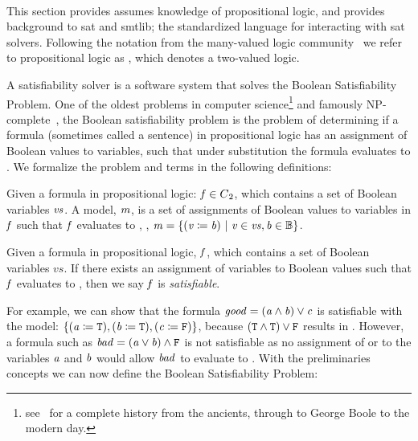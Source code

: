~\label{section:sat-solving}

This section provides assumes knowledge of propositional logic, and provides
background to \acl{sat} and \ac{smtlib}; the standardized language for
interacting with \ac{sat} solvers. Following the notation from the many-valued
logic community~\cite{Rescher1969-RESML} we refer to propositional logic as
\pl{}, which denotes a two-valued logic.

A satisfiability solver is a software system that solves the Boolean
Satisfiability Problem. One of the oldest problems in computer
science\footnote{see~\citet{BBH+09} for a complete history from the ancients,
  through to George Boole to the modern day.} and famously
NP-complete~\cite{10.1145/800157.805047}, the Boolean satisfiability problem is
the problem of determining if a formula (sometimes called a sentence) in
propositional logic has an assignment of Boolean values to variables, such that
under substitution the formula evaluates to \tru{}. We formalize the problem and
terms in the following definitions:

\begin{definition}[Model]
  Given a formula in propositional logic: $\mathit{f} \in {C\textsubscript{2}}{}$, which contains a
  set of Boolean variables $\mathit{vs}$. A model, $\mathit{m}$, is a set of assignments
  of Boolean values to variables in $\mathit{f}$ such that $\mathit{f}$ evaluates to
  \tru{}, \ie{}, $\mathit{m = \{ (v \coloneqq{} b)\ |\ v \in vs, b \in \mathbb{B}} \}$.
\end{definition}

\begin{definition}[Satisfiable]
  Given a formula in propositional logic, $\mathit{f}$, which
  contains a set of Boolean variables $vs$. If there exists an assignment of
  variables to Boolean values such that $\mathit{f}$ evaluates to \tru{}, then we
  say $\mathit{f}$ is \emph{satisfiable}.
\end{definition}

For example, we can show that the formula $\mathit{good = (a \wedge b) \vee c}$ is
satisfiable with the model: $\{\mathit{(a \coloneqq{}{} \texttt{T}{}), (b \coloneqq{}{} \texttt{T}{}),
  (c \coloneqq{}{} \texttt{F}{})}\}$, because $(\texttt{T}{} \wedge{} \texttt{T}{}) \vee{} \texttt{F}{}$
results in \tru{}. However, a formula such as $\mathit{bad = (a \vee b) \wedge
  \texttt{F}{}}$ is not satisfiable as no assignment of \fls{} or \tru{} to the
variables $\mathit{a}$ and $\mathit{b}$ would allow $\mathit{bad}$ to evaluate to \tru{}.
With the preliminaries concepts we can now define the Boolean Satisfiability
Problem:

